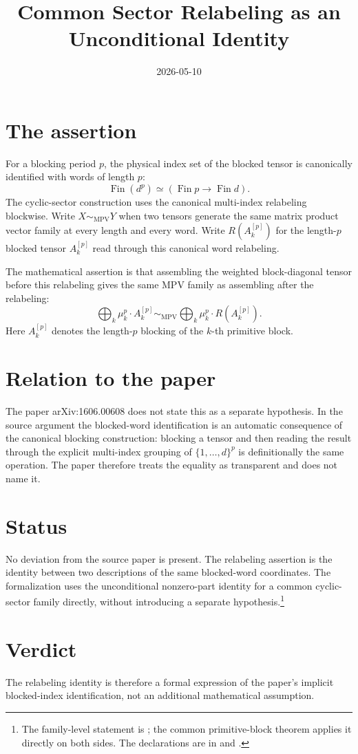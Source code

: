 \documentclass{article}
\title{Common Sector Relabeling as an Unconditional Identity}
\author{}
\date{2026-05-10}
\begin{document}
\maketitle

\section{The assertion}

For a blocking period $p$, the physical index set of the blocked tensor is
canonically identified with words of length $p$:
\[
    \operatorname{Fin}(d^p) \simeq (\operatorname{Fin} p \to \operatorname{Fin} d).
\]
The cyclic-sector construction uses the canonical multi-index relabeling
blockwise. Write $X \sim_{\mathrm{MPV}} Y$ when two tensors generate the
same matrix product vector family at every length and every word. Write
$R(A_k^{[p]})$ for the length-$p$ blocked tensor $A_k^{[p]}$ read
through this canonical word relabeling.

The mathematical assertion is that assembling the weighted block-diagonal
tensor before this relabeling gives the same MPV family as assembling after
the relabeling:
\[
    \bigoplus_k \mu_k^p \cdot A_k^{[p]} \sim_{\mathrm{MPV}}
    \bigoplus_k \mu_k^p \cdot R(A_k^{[p]}).
\]
Here $A_k^{[p]}$ denotes the length-$p$ blocking of the $k$-th primitive block.

\section{Relation to the paper}

The paper arXiv:1606.00608 does not state this as a separate hypothesis.
In the source argument the blocked-word identification is an automatic consequence of the
canonical blocking construction: blocking a tensor and then reading the result through the
explicit multi-index grouping of $\{1,\ldots,d\}^p$ is definitionally the same operation.
The paper therefore treats the equality as transparent and does not name it.

\section{Status}

No deviation from the source paper is present. The relabeling assertion is the
identity between two descriptions of the same blocked-word coordinates. The
formalization uses the unconditional nonzero-part identity for a common
cyclic-sector family directly, without introducing a separate hypothesis.\footnote{%
    The family-level statement is
    ; the
    common primitive-block theorem applies it directly on both sides. The
    declarations are in
    and
    .}

\section{Verdict}

The relabeling identity is therefore a formal expression of the paper's implicit
blocked-index identification, not an additional mathematical assumption.



\end{document}
